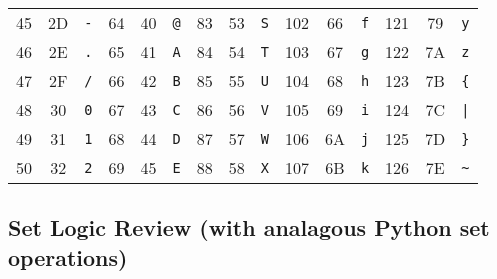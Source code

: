 \documentclass{article}
\begin{document}
\begin{center}
\begin{tabular}{ccc!{\vrule width 1pt}ccc!{\vrule width 1pt}ccc!{\vrule width 1pt}ccc!{\vrule width 1pt}ccc}
45 & 2D & \texttt{-} & 64 & 40 & \texttt{@} & 83 & 53 & \texttt{S} & 102 & 66 & \texttt{f} & 121 & 79 & \texttt{y} \\
46 & 2E & \texttt{.} & 65 & 41 & \texttt{A} & 84 & 54 & \texttt{T} & 103 & 67 & \texttt{g} & 122 & 7A & \texttt{z} \\
47 & 2F & \texttt{/} & 66 & 42 & \texttt{B} & 85 & 55 & \texttt{U} & 104 & 68 & \texttt{h} & 123 & 7B & \texttt{\{} \\
48 & 30 & \texttt{0} & 67 & 43 & \texttt{C} & 86 & 56 & \texttt{V} & 105 & 69 & \texttt{i} & 124 & 7C & \texttt{|} \\
49 & 31 & \texttt{1} & 68 & 44 & \texttt{D} & 87 & 57 & \texttt{W} & 106 & 6A & \texttt{j} & 125 & 7D & \texttt{\}} \\
50 & 32 & \texttt{2} & 69 & 45 & \texttt{E} & 88 & 58 & \texttt{X} & 107 & 6B & \texttt{k} & 126 & 7E & \texttt{\textasciitilde} \\
\bottomrule\end{tabular}\end{center}
\subsection{Set Logic Review (with analagous Python set operations)}
\def\firstcircle{(0,0) circle (1.5cm)}
\def\secondcircle{(0:2cm) circle (1.5cm)}


\end{document}
